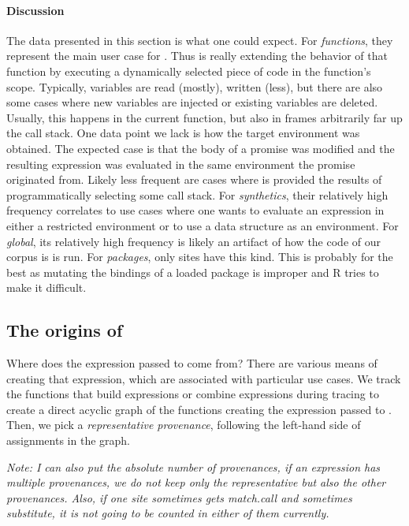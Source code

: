 \documentclass[review,screen,acmsmall]{acmart}
\newcommand{\NOTE}[1]{{\it Note: #1}\xspace}
\begin{document}
\paragraph{Discussion}
The data presented in this section is what one could expect. For {\it
  functions}, they represent the main user case for \eval. Thus \eval is really
extending the behavior of that function by executing a dynamically selected
piece of code in the function's scope. Typically, variables are read (mostly),
written (less), but there are also some cases where new variables are injected
or existing variables are deleted. Usually, this happens in the current
function, but also in frames arbitrarily far up the call stack. One data point
we lack is how the target environment was obtained. The expected case is that
the body of a promise was modified and the resulting expression was evaluated in
the same environment the promise originated from. Likely less frequent are cases
where \eval is provided the results of programmatically selecting some call
stack. For {\it synthetics}, their relatively high frequency correlates to use
cases where one wants to evaluate an expression in either a restricted
environment or to use a data structure as an environment. For {\it global}, its
relatively high frequency is likely an artifact of how the code of our corpus is
is run. For {\it packages}, only \packageNbPackageNamespaceEnvSites sites have
this kind. This is probably for the best as mutating the bindings of
a loaded package is improper and R tries to make it difficult.

\subsection{The origins of \eval}

Where does the expression passed to \eval come from? There are various means of
creating that expression, which are associated with particular use cases. We track the functions that build expressions or combine expressions during tracing to create a direct acyclic graph of the functions creating the expression passed to \eval. Then, we pick a \emph{representative provenance}, \ie following the left-hand side of assignments in the graph. 

\NOTE{I can also put the absolute number of provenances, \ie if an expression has multiple provenances, we do not keep only the representative but also the other provenances. Also, if one site sometimes gets match.call and sometimes substitute, it is not going to be counted in either of them currently.}
\end{document}
